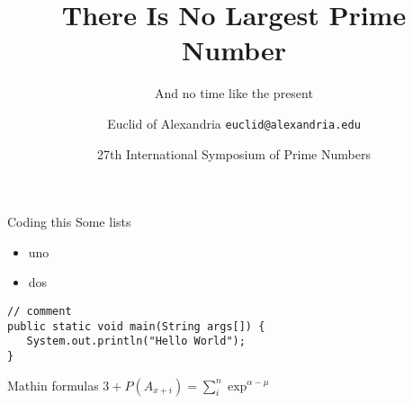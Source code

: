 \documentclass{beamer}
\title{There Is No Largest Prime Number}
\subtitle{And no time like the present}
\date[ISPN ’80]{27th International Symposium of Prime Numbers}
\author[Euclid]{Euclid of Alexandria \texttt{euclid@alexandria.edu}}
\begin{document}
\begin{frame}
\titlepage 
\end{frame}

\begin{frame}[fragile]{Coding this}
Some lists
  \begin{itemize}
  \item uno
  \item dos
  \end{itemize}

\bigskip

\begin{verbatim}
// comment
public static void main(String args[]) {
   System.out.println("Hello World");
}
\end{verbatim}
\end{frame}

\begin{frame}{Math}{in formulas}
  \begin{math}
    3+P(A_{x+i})=\sum_i^n \exp^{\alpha-\mu}
  \end{math}
\end{frame}
\end{document}
